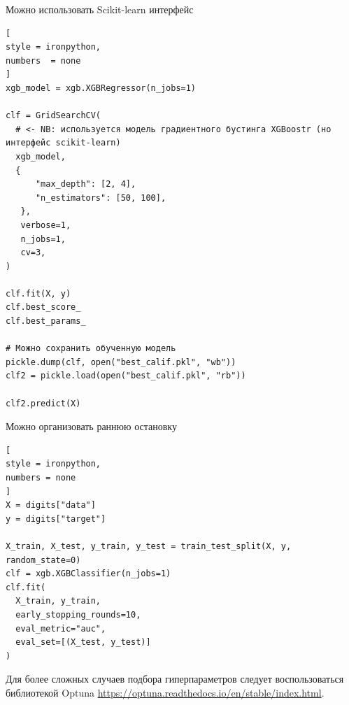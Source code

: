 \documentclass[%
	11pt,
	a4paper,
	utf8,
		]{article}
\begin{document}
Можно использовать Scikit-learn интерфейс
\begin{lstlisting}[
style = ironpython,
numbers  = none
]
xgb_model = xgb.XGBRegressor(n_jobs=1)

clf = GridSearchCV(
  # <- NB: используется модель градиентного бустинга XGBoostr (но интерфейс scikit-learn)
  xgb_model,
  {
      "max_depth": [2, 4],
      "n_estimators": [50, 100],
   },
   verbose=1,
   n_jobs=1,
   cv=3,
)

clf.fit(X, y)
clf.best_score_
clf.best_params_

# Можно сохранить обученную модель
pickle.dump(clf, open("best_calif.pkl", "wb"))
clf2 = pickle.load(open("best_calif.pkl", "rb"))

clf2.predict(X)
\end{lstlisting}

Можно организовать раннюю остановку
\begin{lstlisting}[
style = ironpython,
numbers = none
]
X = digits["data"]
y = digits["target"]

X_train, X_test, y_train, y_test = train_test_split(X, y, random_state=0)
clf = xgb.XGBClassifier(n_jobs=1)
clf.fit(
  X_train, y_train,
  early_stopping_rounds=10,
  eval_metric="auc",
  eval_set=[(X_test, y_test)]
)
\end{lstlisting}

Для более сложных случаев подбора гиперпараметров следует воспользоваться библиотекой Optuna \url{https://optuna.readthedocs.io/en/stable/index.html}.
\end{document}
